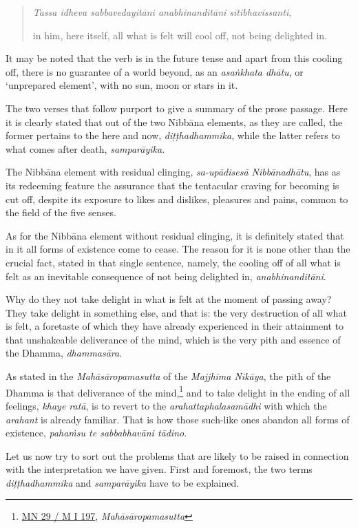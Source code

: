 \begin{quote}
\emph{Tassa idheva sabbavedayitāni anabhinanditāni sītibhavissanti},

in him, here itself, all what is felt will cool off, not being delighted in.
\end{quote}

It may be noted that the verb is in the future tense and apart from this cooling off, there is no guarantee of a world beyond, as an \emph{asaṅkhata dhātu}, or `unprepared element', with no sun, moon or stars in it.

The two verses that follow purport to give a summary of the prose passage. Here it is clearly stated that out of the two Nibbāna elements, as they are called, the former pertains to the here and now, \emph{diṭṭhadhammika}, while the latter refers to what comes after death, \emph{samparāyika}.

The Nibbāna element with residual clinging, \emph{sa-upādisesā Nibbānadhātu}, has as its redeeming feature the assurance that the tentacular craving for becoming is cut off, despite its exposure to likes and dislikes, pleasures and pains, common to the field of the five senses.

As for the Nibbāna element without residual clinging, it is definitely stated that in it all forms of existence come to cease. The reason for it is none other than the crucial fact, stated in that single sentence, namely, the cooling off of all what is felt as an inevitable consequence of not being delighted in, \emph{anabhinanditāni}.

Why do they not take delight in what is felt at the moment of passing away? They take delight in something else, and that is: the very destruction of all what is felt, a foretaste of which they have already experienced in their attainment to that unshakeable deliverance of the mind, which is the very pith and essence of the Dhamma, \emph{dhammasāra}.

As stated in the \emph{Mahāsāropamasutta} of the \emph{Majjhima Nikāya}, the pith of the Dhamma is that deliverance of the mind,\footnote{\href{https://suttacentral.net/mn29/pli/ms}{MN 29 / M I 197}, \emph{Mahāsāropamasutta}} and to take delight in the ending of all feelings, \emph{khaye ratā}, is to revert to the \emph{arahattaphalasamādhi} with which the \emph{arahant} is already familiar. That is how those such-like ones abandon all forms of existence, \emph{pahaṁsu te sabbabhavāni tādino}.

Let us now try to sort out the problems that are likely to be raised in connection with the interpretation we have given. First and foremost, the two terms \emph{diṭṭhadhammika} and \emph{samparāyika} have to be explained.

